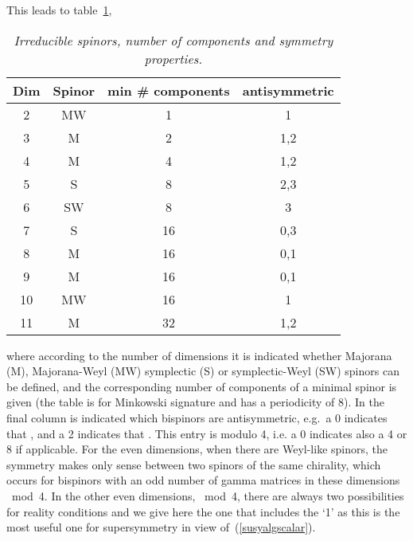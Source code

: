 \documentclass[a4paper,11pt,twoside]{article}
\begin{document}
This leads to table~\ref{tbl:spinors},
\begin{table}[htbp]
  \caption{\it Irreducible spinors, number of components and symmetry
  properties.}\label{tbl:spinors}
\begin{center}
  \begin{tabular}{|c|c|c|c|}
\hline
 Dim & Spinor & min \# components & antisymmetric \\
\hline
 2 & MW & 1 & 1 \\
 3 & M & 2 & 1,2 \\
 4 & M & 4 & 1,2 \\
 5 & S & 8 & 2,3 \\
 6 & SW & 8 & 3 \\
 7 & S & 16 & 0,3 \\
 8 & M & 16 & 0,1 \\
 9 & M & 16 & 0,1 \\
 10 & MW & 16 & 1 \\
 11 & M & 32 & 1,2 \\
\hline
\end{tabular}
\end{center}
\end{table}
where according to the number of dimensions it is indicated whether
Majorana (M), Majorana-Weyl (MW) symplectic (S) or symplectic-Weyl (SW)
spinors can be defined, and the corresponding number of components of a
minimal spinor is given (the table is for Minkowski signature and has a
periodicity of 8). In the final column is indicated which bispinors are
antisymmetric, e.g.\ a 0 indicates that \coordHE{}, and a 2 indicates that \coordHE{}. This entry is modulo 4, i.e. a 0 indicates also a 4 or 8
if applicable. For the even dimensions, when there are Weyl-like spinors,
the symmetry makes only sense between two spinors of the same chirality,
which occurs for bispinors with an odd number of gamma matrices in these
dimensions \coordHE{}~mod~4. In the other even dimensions, \coordHE{}~mod~4, there
are always two possibilities for reality conditions and we give here the
one that includes the `1' as this is the most useful one for
supersymmetry in view of~(\ref{susyalgscalar}).
\end{document}
